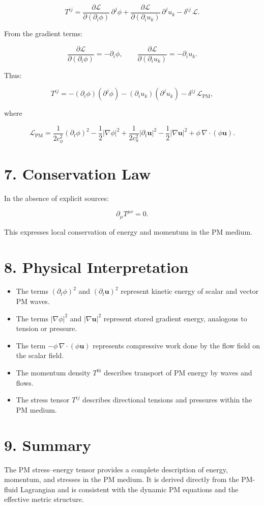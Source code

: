 \documentclass{article}
\begin{document}
\[
T^{ij}
=
\frac{\partial \mathcal{L}}{\partial(\partial_i \phi)}\,\partial^j \phi
+
\frac{\partial \mathcal{L}}{\partial(\partial_i u_k)}\,\partial^j u_k
- \delta^{ij}\,\mathcal{L}.
\]



From the gradient terms:


\[
\frac{\partial \mathcal{L}}{\partial(\partial_i \phi)}
= -\partial_i \phi,
\qquad
\frac{\partial \mathcal{L}}{\partial(\partial_i u_k)}
= -\partial_i u_k.
\]



Thus:


\[
T^{ij}
=
- (\partial_i \phi)(\partial^j \phi)
- (\partial_i u_k)(\partial^j u_k)
- \delta^{ij}\,\mathcal{L}_{\text{PM}},
\]


where


\[
\mathcal{L}_{\text{PM}}
=
\frac{1}{2c_\phi^2}(\partial_t \phi)^2
- \frac{1}{2}|\nabla \phi|^2
+
\frac{1}{2c_u^2}|\partial_t \mathbf u|^2
- \frac{1}{2}|\nabla \mathbf u|^2
+
\phi\,\nabla\cdot(\phi\mathbf u).
\]



\section*{7. Conservation Law}

In the absence of explicit sources:


\[
\partial_\mu T^{\mu\nu} = 0.
\]



This expresses local conservation of energy and momentum in the PM medium.

\section*{8. Physical Interpretation}

\begin{itemize}
    \item The terms $(\partial_t \phi)^2$ and $(\partial_t \mathbf u)^2$ represent kinetic energy of scalar and vector PM waves.
    \item The terms $|\nabla \phi|^2$ and $|\nabla \mathbf u|^2$ represent stored gradient energy, analogous to tension or pressure.
    \item The term $-\phi\,\nabla\cdot(\phi\mathbf u)$ represents compressive work done by the flow field on the scalar field.
    \item The momentum density $T^{0i}$ describes transport of PM energy by waves and flows.
    \item The stress tensor $T^{ij}$ describes directional tensions and pressures within the PM medium.
\end{itemize}

\section*{9. Summary}

The PM stress--energy tensor provides a complete description of energy,
momentum, and stresses in the PM medium. It is derived directly from the
PM-fluid Lagrangian and is consistent with the dynamic PM equations and the
effective metric structure.
\end{document}
